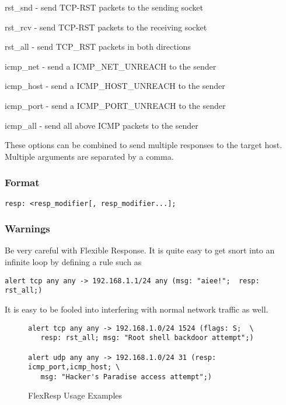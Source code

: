 \documentclass[english]{report}
\begin{document}
rst\_snd - send TCP-RST packets to the sending socket 

rst\_rcv - send TCP-RST packets to the receiving socket 

rst\_all - send TCP\_RST packets in both directions 

icmp\_net - send a ICMP\_NET\_UNREACH to the sender 

icmp\_host - send a ICMP\_HOST\_UNREACH to the sender 

icmp\_port - send a ICMP\_PORT\_UNREACH to the sender 

icmp\_all - send all above ICMP packets to the sender

These options can be combined to send multiple responses to the target
host. Multiple arguments are separated by a comma.


\subsubsection{Format}

\begin{verbatim}
resp: <resp_modifier[, resp_modifier...];
\end{verbatim}

\subsubsection{Warnings}

Be very careful with Flexible Response. It is quite easy to get snort
into an infinite loop by defining a rule such as 

\begin{verbatim}
alert tcp any any -> 192.168.1.1/24 any (msg: "aiee!";  resp: rst_all;)
\end{verbatim}
It is easy to be fooled into interfering with normal network traffic
as well. 

%
\begin{figure}[!hbpt]
\begin{verbatim}
alert tcp any any -> 192.168.1.0/24 1524 (flags: S;  \
   resp: rst_all; msg: "Root shell backdoor attempt";)

alert udp any any -> 192.168.1.0/24 31 (resp: icmp_port,icmp_host; \
   msg: "Hacker's Paradise access attempt";)
\end{verbatim}

\caption{\label{flexresp examples} FlexResp Usage Examples}
\end{figure}
\end{document}
